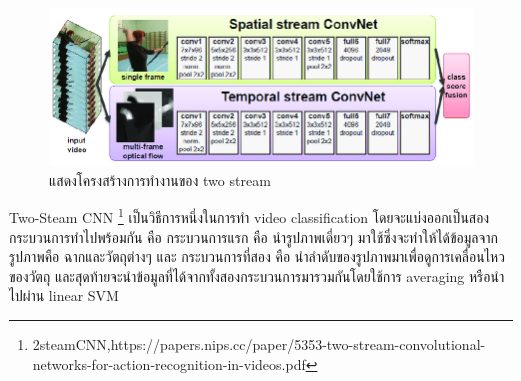 \begin{figure}[!ht]
	\centering
	\includegraphics[width=1\textwidth]{chapter2/images/2steamCNN.png}
		\caption{แสดงโครงสร้างการทำงานของ two stream}
    	\label{fig:/2steamCNN}
\end{figure}

Two-Steam CNN \footnote{2steamCNN,https://papers.nips.cc/paper/5353-two-stream-convolutional-networks-for-action-recognition-in-videos.pdf} เป็นวิธีการหนึ่งในการทำ video classification โดยจะแบ่งออกเป็นสองกระบวนการทำไปพร้อมกัน คือ กระบวนการแรก คือ นำรูปภาพเดี่ยวๆ มาใช้ซึ่งจะทำให้ได้ข้อมูลจากรูปภาพคือ ฉากและวัตถุต่างๆ และ กระบวนการที่สอง คือ นำลำดับของรูปภาพมาเพื่อดูการเคลื่อนไหวของวัตถุ และสุดท้ายจะนำข้อมูลที่ได้จากทั้งสองกระบวนการมารวมกันโดยใช้การ averaging หรือนำไปผ่าน linear SVM 
